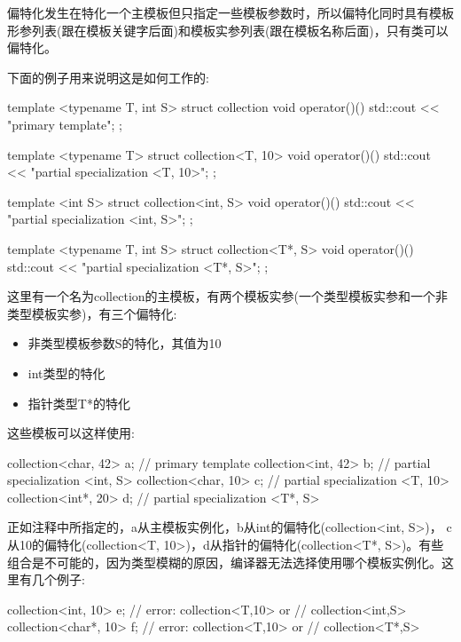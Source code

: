 偏特化发生在特化一个主模板但只指定一些模板参数时，所以偏特化同时具有模板形参列表(跟在模板关键字后面)和模板实参列表(跟在模板名称后面)，只有类可以偏特化。

下面的例子用来说明这是如何工作的:

\begin{cpp}
template <typename T, int S>
struct collection
{
	void operator()()
	{ std::cout << "primary template\n"; }
};

template <typename T>
struct collection<T, 10>
{
	void operator()()
	{ std::cout << "partial specialization <T, 10>\n"; }
};

template <int S>
struct collection<int, S>
{
	void operator()()
	{ std::cout << "partial specialization <int, S>\n"; }
};

template <typename T, int S>
struct collection<T*, S>
{
	void operator()()
	{ std::cout << "partial specialization <T*, S>\n"; }
};
\end{cpp}

这里有一个名为collection的主模板，有两个模板实参(一个类型模板实参和一个非类型模板实参)，有三个偏特化:

\begin{itemize}
\item 
非类型模板参数S的特化，其值为10

\item 
int类型的特化

\item 
指针类型T*的特化
\end{itemize}

这些模板可以这样使用:

\begin{cpp}
collection<char, 42> a; // primary template
collection<int, 42> b; // partial specialization <int, S>
collection<char, 10> c; // partial specialization <T, 10>
collection<int*, 20> d; // partial specialization <T*, S>
\end{cpp}

正如注释中所指定的，a从主模板实例化，b从int的偏特化(collection<int, S>)， c从10的偏特化(collection<T, 10>)，d从指针的偏特化(collection<T*, S>)。有些组合是不可能的，因为类型模糊的原因，编译器无法选择使用哪个模板实例化。这里有几个例子:

\begin{cpp}
collection<int, 10> e; // error: collection<T,10> or
                       // collection<int,S>
collection<char*, 10> f; // error: collection<T,10> or
                         // collection<T*,S>
\end{cpp}


